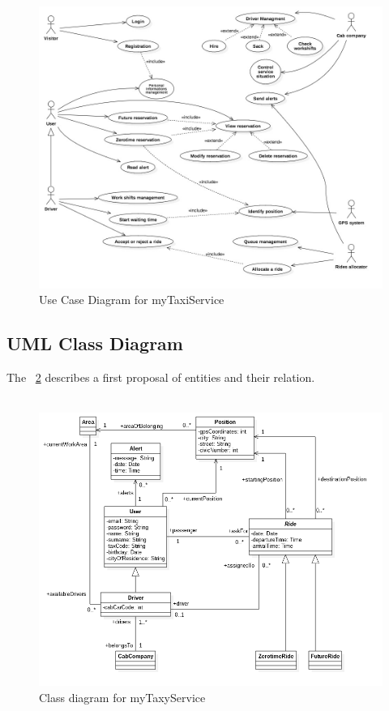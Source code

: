 \begin{figure}
	\centerline{\includegraphics[width=\paperwidth]{./figures/UseCaseDiagram.jpg}}
	\caption{Use Case Diagram for myTaxiService}
	\label{ucDia}
\end{figure}

\clearpage

\subsection{UML Class Diagram}
The \figurename~\ref{cDia} describes a first proposal of entities and their relation.\\
\\

\begin{figure}[h!]
	\centerline{\includegraphics[width=\textwidth]{./figures/ClassDiagram.png}}
	\caption{Class diagram for myTaxyService}
	\label{cDia}
\end{figure}

